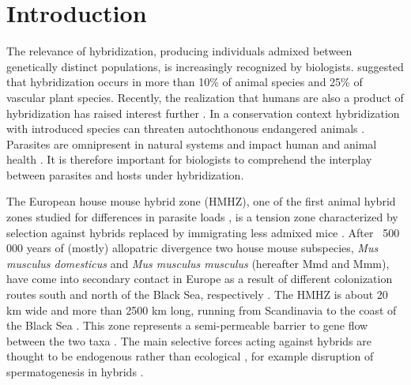 \section{Introduction}
The relevance of hybridization, producing individuals admixed between genetically distinct populations, is increasingly recognized by biologists. \cite{mallet_hybridization_2005} suggested that hybridization occurs in more than 10\% of animal species and 25\% of vascular plant species. Recently, the realization that humans are also a product of hybridization has raised interest further \citep{green_draft_2010}. In a conservation context hybridization with introduced species can threaten autochthonous endangered animals \citep{simberloff_hybridization_1996}. Parasites are omnipresent in natural systems and impact human and animal health \citep{schurer_community-based_2016}. It is therefore important for biologists to comprehend the interplay between parasites and hosts under hybridization.
\par The European house mouse hybrid zone (HMHZ), one of the first animal hybrid zones studied for differences in parasite loads \citep{sage_wormy_1986}, is a tension zone characterized by selection against hybrids replaced by immigrating less admixed mice \citep{barton_analysis_1985}. After ~500 000 years of (mostly) allopatric divergence two house mouse subspecies, \textit{Mus musculus domesticus} and \textit{Mus musculus musculus} (hereafter Mmd and Mmm), have come into secondary contact in Europe as a result of different colonization routes south and north of the Black Sea, respectively \citep{boursot_evolution_1993, duvaux_isolation_2011}. The HMHZ is about 20 km wide and more than 2500 km long, running from Scandinavia to the coast of the Black Sea \citep{baird_what_2012, boursot_evolution_1993, jones_norwegian_2010, macholan_location_2003}. This zone represents a semi-permeable barrier to gene flow between the two taxa \citep{macholan_genetic_2007, macholan_assessing_2011}. The main selective forces acting against hybrids are thought to be endogenous rather than ecological \citep{baird_what_2012, boursot_evolution_1993}, for example disruption of spermatogenesis in hybrids \citep{albrechtova_sperm-related_2012, turner_reduced_2012}.

